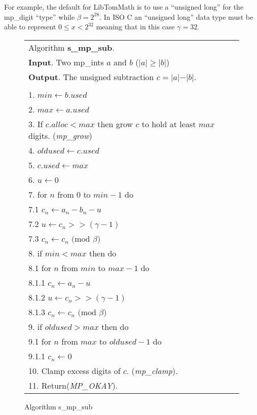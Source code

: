 \documentclass[b5paper]{book}
\begin{document}
For example, the default for LibTomMath is to use a ``unsigned long'' for the mp\_digit ``type'' while $\beta = 2^{28}$.  In ISO C an ``unsigned long''
data type must be able to represent $0 \le x < 2^{32}$ meaning that in this case $\gamma = 32$.

\newpage\begin{figure}[!here]
\begin{center}
\begin{small}
\begin{tabular}{l}
\hline Algorithm \textbf{s\_mp\_sub}. \\
\textbf{Input}.   Two mp\_ints $a$ and $b$ ($\vert a \vert \ge \vert b \vert$) \\
\textbf{Output}.  The unsigned subtraction $c = \vert a \vert - \vert b \vert$. \\
\hline \\
1.  $min \leftarrow b.used$ \\
2.  $max \leftarrow a.used$ \\
3.  If $c.alloc < max$ then grow $c$ to hold at least $max$ digits.  (\textit{mp\_grow}) \\
4.  $oldused \leftarrow c.used$ \\ 
5.  $c.used \leftarrow max$ \\
6.  $u \leftarrow 0$ \\
7.  for $n$ from $0$ to $min - 1$ do \\
\hspace{3mm}7.1  $c_n \leftarrow a_n - b_n - u$ \\
\hspace{3mm}7.2  $u   \leftarrow c_n >> (\gamma - 1)$ \\
\hspace{3mm}7.3  $c_n \leftarrow c_n \mbox{ (mod }\beta\mbox{)}$ \\
8.  if $min < max$ then do \\
\hspace{3mm}8.1  for $n$ from $min$ to $max - 1$ do \\
\hspace{6mm}8.1.1  $c_n \leftarrow a_n - u$ \\
\hspace{6mm}8.1.2  $u   \leftarrow c_n >> (\gamma - 1)$ \\
\hspace{6mm}8.1.3  $c_n \leftarrow c_n \mbox{ (mod }\beta\mbox{)}$ \\
9. if $oldused > max$ then do \\
\hspace{3mm}9.1  for $n$ from $max$ to $oldused - 1$ do \\
\hspace{6mm}9.1.1  $c_n \leftarrow 0$ \\
10. Clamp excess digits of $c$.  (\textit{mp\_clamp}). \\
11. Return(\textit{MP\_OKAY}). \\
\hline
\end{tabular}
\end{small}
\end{center}
\caption{Algorithm s\_mp\_sub}
\end{figure}
\end{document}
